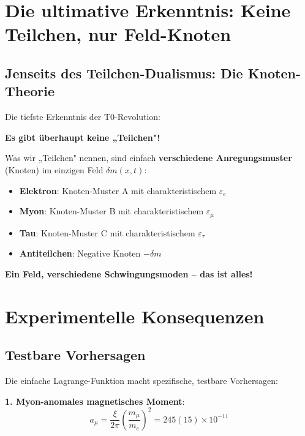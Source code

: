 \documentclass[12pt,a4paper]{article}
\newcommand{\deltam}{\delta m}
\newcommand{\xipar}{\xi}
\theoremstyle{definition}
\theoremstyle{remark}
\begin{document}
	\section{Die ultimative Erkenntnis: Keine Teilchen, nur Feld-Knoten}
	
	\subsection{Jenseits des Teilchen-Dualismus: Die Knoten-Theorie}
	
	Die tiefste Erkenntnis der T0-Revolution:
	
	\begin{tcolorbox}[colback=purple!5!white,colframe=purple!75!black,title=Ultimative Wahrheit: Keine separaten Teilchen]
		\textbf{Es gibt überhaupt keine „Teilchen"!}
		
		Was wir „Teilchen" nennen, sind einfach \textbf{verschiedene Anregungsmuster} (Knoten) im einzigen Feld $\deltam(x,t)$:
		
		\begin{itemize}
			\item \textbf{Elektron}: Knoten-Muster A mit charakteristischem $\varepsilon_e$
			\item \textbf{Myon}: Knoten-Muster B mit charakteristischem $\varepsilon_{\mu}$
			\item \textbf{Tau}: Knoten-Muster C mit charakteristischem $\varepsilon_{\tau}$
			\item \textbf{Antiteilchen}: Negative Knoten $-\deltam$
		\end{itemize}
		
		\textbf{Ein Feld, verschiedene Schwingungsmoden -- das ist alles!}
	\end{tcolorbox}
	
	\section{Experimentelle Konsequenzen}
	
	\subsection{Testbare Vorhersagen}
	
	Die einfache Lagrange-Funktion macht spezifische, testbare Vorhersagen:
	
	\textbf{1. Myon-anomales magnetisches Moment}:
	\begin{equation}
		a_{\mu} = \frac{\xipar}{2\pi} \left(\frac{m_{\mu}}{m_e}\right)^2 = 245(15) \times 10^{-11}
	\end{equation}
	
\end{document}
